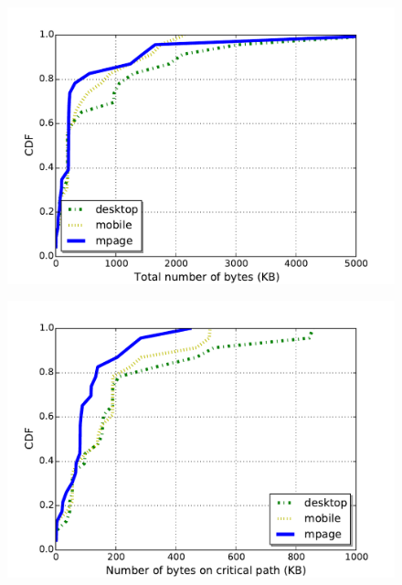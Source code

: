 \begin{figure}[!htb]
\begin{minipage}[b]{.48\textwidth}
  \includegraphics[width=\linewidth]{./figures/criticalpath/num_bytes_all.pdf}
  \label{fig:numbytesall}
\end{minipage}%
\hspace{0.5cm}
\begin{minipage}[b]{.48\textwidth}
  \includegraphics[width=\linewidth]{./figures/criticalpath/num_bytes_cp.pdf}
  \label{fig:numbytescp}
\end{minipage}
\end{figure}

